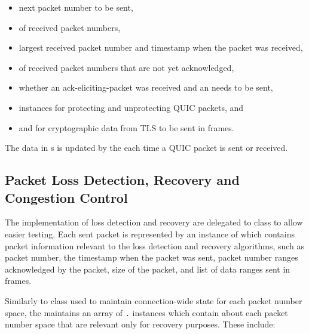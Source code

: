 \begin{itemize}

  \item next packet number to be sent,

  \item \PacketNumberWindow{} of received packet numbers,

  \item largest received packet number and timestamp when the packet was received,

  \item \RangeSet{} of received packet numbers that are not yet acknowledged,

  \item whether an \gls{ack-eliciting-packet} was received and an \ACK{} needs to be sent,

  \item \CryptoSeal{} instances for protecting and unprotecting QUIC packets, and

  \item \SendStream{} and \ReceiveStream{} for cryptographic data from TLS to be sent in \CRYPTO{}
frames.

\end{itemize}

The data in \PacketNumberSpace{}s is updated by the \ManagedQuicConnection{} each time a QUIC packet
is sent or received.

\subsection{Packet Loss Detection, Recovery and Congestion Control}

The implementation of loss detection and recovery are delegated to \RecoveryController{} class to
allow easier testing. Each sent packet is represented by an instance of \SentPacket{} which contains
packet information relevant to the loss detection and recovery algorithms, such as packet number,
the timestamp when the packet was sent, packet number ranges acknowledged by the packet, size of the
packet, and list of data ranges sent in \STREAM{} frames.

Similarly to \PacketNumberSpace{} class used to maintain connection-wide state for each packet
number space, the \RecoveryController{} maintains an array of
\texttt{\RecoveryController{}.\PacketNumberSpace{}} instances which contain about each packet number
space that are relevant only for recovery purposes. These include:

